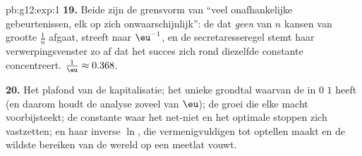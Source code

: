 \begin{solution}{pb:g12:exp:1}
\textbf{19.} Beide zijn de grensvorm van ``veel onafhankelijke
gebeurtenissen, elk op zich onwaarschijnlijk'': de  dat \emph{geen} van
$n$ kansen van grootte $\frac1n$ afgaat, streeft naar $\eu^{-1}$, en de
secretaresseregel stemt haar verwerpingsvenster zo af dat het succes zich
rond diezelfde constante concentreert. $\frac1\eu \approx 0.368$.

\textbf{20.} Het plafond van de kapitalisatie; het unieke grondtal waarvan de
 in $0$  $1$ heeft (en daarom houdt de analyse
zoveel van $\eu$); de groei die elke macht voorbijsteekt; de constante waar
het net-niet en het optimale stoppen zich vastzetten; en haar inverse $\ln$,
die vermenigvuldigen tot optellen maakt en de wildste bereiken van de wereld
op een meetlat vouwt.
\end{solution}
